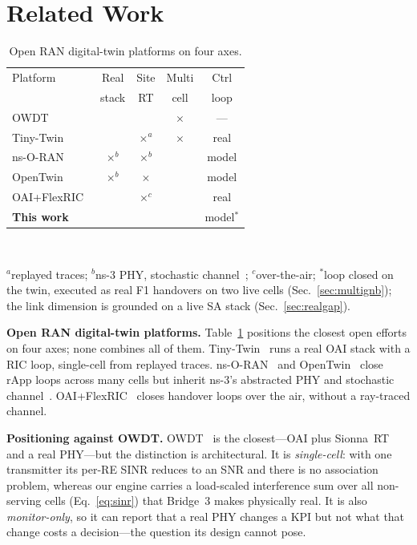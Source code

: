 \documentclass[conference]{IEEEtran}
\newcommand{\y}{\checkmark}
\newcommand{\n}{$\times$}
\begin{document}
\section{Related Work}
\begin{table}[tb]
\caption{Open RAN digital-twin platforms on four axes.}
\label{tab:related}
\centering
\footnotesize
\setlength{\tabcolsep}{4pt}
\begin{tabular}{@{}lcccc@{}}
\toprule
Platform & Real & Site & Multi & Ctrl \\
 & stack & RT & cell & loop \\
\midrule
OWDT~\cite{owdt} & \y & \y & \n & --- \\
Tiny-Twin~\cite{tinytwin} & \y & \n$^{a}$ & \n & real \\
ns-O-RAN~\cite{nsoran} & \n$^{b}$ & \n$^{b}$ & \y & model \\
OpenTwin~\cite{opentwin} & \n$^{b}$ & \n & \y & model \\
OAI+FlexRIC~\cite{oaiho} & \y & \n$^{c}$ & \y & real \\
\textbf{This work} & \y & \y & \y & model$^{*}$ \\
\bottomrule
\end{tabular}
\\[2pt]
\raggedright\scriptsize
$^{a}$replayed traces; $^{b}$ns-3 PHY, stochastic channel~\cite{lena}; $^{c}$over-the-air;
$^{*}$loop closed on the twin, executed as real F1 handovers on two live cells (Sec.~\ref{sec:multignb});
the link dimension is grounded on a live SA stack (Sec.~\ref{sec:realgap}).
\end{table}

\textbf{Open RAN digital-twin platforms.} Table~\ref{tab:related} positions the closest open efforts on four axes; none combines all of them. Tiny-Twin~\cite{tinytwin} runs a real OAI stack with a RIC loop, single-cell from replayed traces. ns-O-RAN~\cite{nsoran} and OpenTwin~\cite{opentwin} close rApp loops across many cells but inherit ns-3's abstracted PHY and stochastic channel~\cite{lena}. OAI+FlexRIC~\cite{oaiho} closes handover loops over the air, without a ray-traced channel.

\textbf{Positioning against OWDT.} OWDT~\cite{owdt} is the closest---OAI plus Sionna~RT and a real PHY---but the distinction is architectural. It is \emph{single-cell}: with one transmitter its per-RE SINR reduces to an SNR and there is no association problem, whereas our engine carries a load-scaled interference sum over all non-serving cells (Eq.~\ref{eq:sinr}) that Bridge~3 makes physically real. It is also \emph{monitor-only}, so it can report that a real PHY changes a KPI but not what that change costs a decision---the question its design cannot pose.
\end{document}
